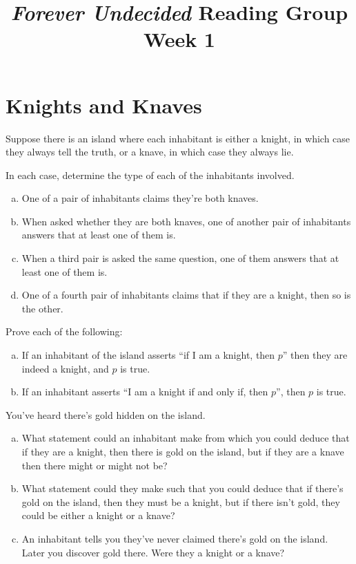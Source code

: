 \documentclass{article}
\title{\emph{Forever Undecided} Reading Group \\ Week 1}
\date{}
\author{}
\begin{document}
\maketitle

\section*{Knights and Knaves}
Suppose there is an island where each inhabitant is either a knight, in which case they always tell the truth, or a knave, in which case they always lie.

\begin{prob}{1.1}
    In each case, determine the type of each of the inhabitants involved.
    \begin{enumerate}[a)]
        \item One of a pair of inhabitants claims they're both knaves.
        \item When asked whether they are both knaves, one of another pair of inhabitants answers that at least one of them is.
        \item When a third pair is asked the same question, one of them answers that at least one of them is.
        \item One of a fourth pair of inhabitants claims that if they are a knight, then so is the other.
    \end{enumerate}
\end{prob}

\begin{prob}{1.2}
    Prove each of the following:
    \begin{enumerate}[a)]
        \item If an inhabitant of the island asserts ``if I am a knight, then $p$'' then they are indeed a knight, and $p$ is true.
        \item If an inhabitant asserts ``I am a knight if and only if, then $p$'', then $p$ is true.
    \end{enumerate}
\end{prob}

\begin{prob}{1.3}
    You've heard there's gold hidden on the island.
    \begin{enumerate}[a)]
        \item What statement could an inhabitant make from which you could deduce that if they are a knight, then there is gold on the island, but if they are a knave then there might or might not be?
        \item What statement could they make such that you could deduce that if there's gold on the island, then they must be a knight, but if there isn't gold, they could be either a knight or a knave?
        \item An inhabitant tells you they've never claimed there's gold on the island. Later you discover gold there. Were they a knight or a knave?
    \end{enumerate}
\end{prob}
\end{document}
